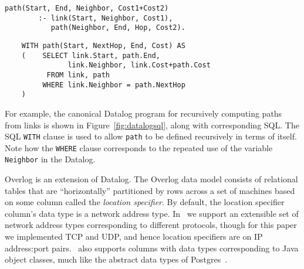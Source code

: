 \documentclass{sig-alternate}
\begin{document}
\begin{figure*}[ht]
\begin{minipage}{0.5\linewidth}
\begin{small}
\begin{verbatim}
path(Start, End, Neighbor, Cost1+Cost2)
        :- link(Start, Neighbor, Cost1),
           path(Neighbor, End, Hop, Cost2).
\end{verbatim}
\end{small}
\end{minipage}
\begin{minipage}{0.5\linewidth}
\begin{small}
\begin{verbatim}
	WITH path(Start, NextHop, End, Cost) AS
	( 	 SELECT link.Start, path.End, 
	           link.Neighbor, link.Cost+path.Cost
	      FROM link, path
	     WHERE link.Neighbor = path.NextHop
	)
\end{verbatim}
\end{small}
\end{minipage}
\caption{Simple Datalog and SQL for computing paths as transitive closure of links.}
\label{fig:datalogsql}
\end{figure*}
For example, the canonical Datalog program for recursively computing paths from links is shown in Figure~\ref{fig:datalogsql}, along with corresponding SQL.  The SQL {\tt WITH} clause is used to allow {\tt path} to be defined recursively in terms of itself.  Note how the {\tt WHERE} clause corresponds to the repeated use of the variable {\tt Neighbor} in the Datalog.

Overlog is an extension of Datalog.
The Overlog data model consists of relational tables that are ``horizontally'' partitioned by rows across a set of machines based on some column called the {\em location specifier}.  By default, the location specifier column's data type is a network address type.  In \JOL\ we support an extensible set of network address types corresponding to different protocols, though for this paper we implemented TCP and UDP, and hence location specifiers are on IP address:port pairs.  \JOL\ also supports columns with data types corresponding to Java object classes, much like the abstract data types of Postgres~\cite{postgres}.
\end{document}
